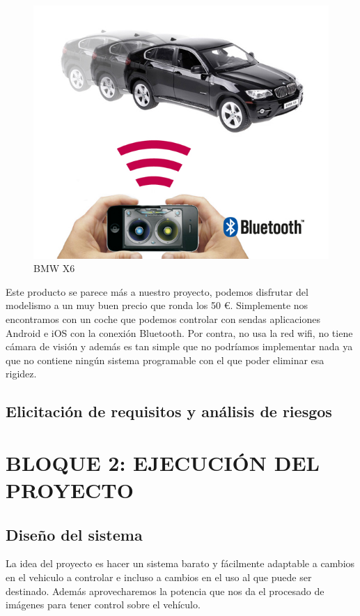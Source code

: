 \documentclass{pclass}
\begin{document}
\begin{figure}[H]
  \centering
    \includegraphics[width=1.2\textwidth]{img/producto2}
  \caption{BMW X6}
  \label{fig:BMWX6}
\end{figure}


Este producto se parece más a nuestro proyecto, podemos disfrutar del modelismo a un muy buen precio que ronda los 50 \euro. Simplemente nos encontramos con un coche que podemos controlar con sendas aplicaciones Android e iOS con la conexión Bluetooth. Por contra, no usa la red wifi, no tiene cámara de visión y además es tan simple que no podríamos implementar nada ya que no contiene ningún sistema programable con el que poder eliminar esa rigidez.



\section{Elicitación de requisitos y análisis de riesgos}


\chapter{BLOQUE 2: EJECUCIÓN DEL PROYECTO}
\section{Diseño del sistema}

La idea del proyecto es hacer un sistema barato y fácilmente adaptable a cambios en el vehiculo a controlar e incluso a cambios en el uso al que puede ser destinado. Además aprovecharemos la potencia que nos da el procesado de imágenes para tener control sobre el vehículo.
\end{document}

